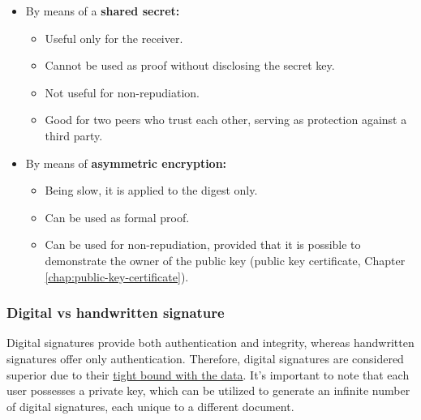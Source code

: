 \begin{itemize}
	\item By means of a \textbf{shared secret:}
	      \begin{itemize}
		      \item Useful only for the receiver.
		      \item Cannot be used as proof without disclosing the secret key.
		      \item Not useful for non-repudiation.
		      \item Good for two peers who trust each other, serving as protection against a third party.
	      \end{itemize}

	\item By means of \textbf{asymmetric encryption:}
	      \begin{itemize}
		      \item Being slow, it is applied to the digest only.
		      \item Can be used as formal proof.
		      \item Can be used for non-repudiation, provided that it is possible to demonstrate the owner of the public key (public key certificate, Chapter \ref*{chap:public-key-certificate}).
	      \end{itemize}
\end{itemize}


\subsubsection{Digital vs handwritten signature}
Digital signatures provide both authentication and integrity, whereas handwritten signatures offer only authentication. Therefore, digital signatures are considered superior due to their \underline{tight bound with the data}. It's important to note that each user possesses a private key, which can be utilized to generate an infinite number of digital signatures, each unique to a different document.


